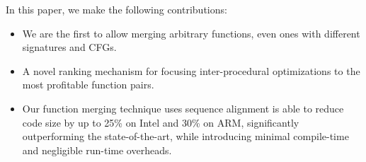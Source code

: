 In this paper, we make the following contributions:
\begin{itemize}[noitemsep,topsep=3pt]
  \item We are the first to allow merging arbitrary functions, even ones with
    different signatures and CFGs.
  \item A novel ranking mechanism for focusing inter-procedural optimizations
    to the most profitable function pairs.
  \item Our function merging technique uses sequence alignment is able to reduce
     code size by up to 25\% on Intel and 30\% on ARM, significantly outperforming the
    state-of-the-art, while introducing minimal compile-time and negligible run-time overheads.
\end{itemize}





